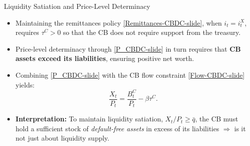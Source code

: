 \documentclass[11pt,aspectratio=169]{beamer}
\begin{document}
\begin{frame}{Liquidity Satiation and Price-Level Determinacy}
\small

\begin{itemize}
    \item Maintaining the remittances policy \eqref{Remittances-CBDC-slide}, when $i_t = i_t^X$, requires 
          \textbf{$\tau^C > 0$} so that the CB does not require support from the treasury.
    \vspace{0.8em}

    \item Price-level determinacy through \eqref{P_CBDC-slide} in turn requires that 
          \textbf{CB assets exceed its liabilities}, ensuring positive net worth.
    \vspace{0.8em}

    \item Combining \eqref{P_CBDC-slide} with the CB flow constraint \eqref{Flow-CBDC-slide} yields:
    \begin{equation*}
        \frac{X_t}{P_t}
        = 
        \frac{B_t^C}{P_t}
        - \beta \tau^C.
    \end{equation*}

\vspace{0.5em}

\item \textbf{Interpretation:}  
To maintain liquidity satiation, $X_t / P_t \ge \bar q$, the CB must hold a sufficient stock of \emph{default-free assets} in excess of its liabilities $\Longrightarrow$ is it not just about liquidity supply. 
\end{itemize}
\end{frame}
\end{document}
